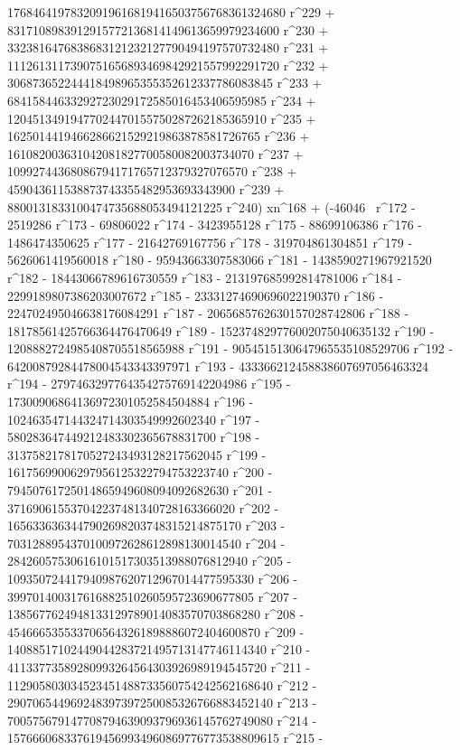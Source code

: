        17684641978320919616819416503756768361324680 r^229 + 
       8317108983912915772136814149613659979234600 r^230 + 
       3323816476838683121232127790494197570732480 r^231 + 
       1112613117390751656893469842921557992291720 r^232 + 
       306873652244418498965355352612337786083845 r^233 + 
       68415844633292723029172585016453406595985 r^234 + 
       12045134919477024470155750287262185365910 r^235 + 
       1625014419466286621529219863878581726765 r^236 + 
       161082003631042081827700580082003734070 r^237 + 
       10992744368086794171765712379327076570 r^238 + 
       459043611538873743355482953693343900 r^239 + 
       8800131833100474735688053494121225 r^240) xn^168 + (-46046 \
r^172 - 2519286 r^173 - 69806022 r^174 - 3423955128 r^175 - 
       88699106386 r^176 - 1486474350625 r^177 - 
       21642769167756 r^178 - 319704861304851 r^179 - 
       5626061419560018 r^180 - 95943663307583066 r^181 - 
       1438590271967921520 r^182 - 18443066789616730559 r^183 - 
       213197685992814781006 r^184 - 2299189807386203007672 r^185 - 
       23331274690696022190370 r^186 - 
       224702495046638176084291 r^187 - 
       2065685762630157028742806 r^188 - 
       18178561425766364476470649 r^189 - 
       152374829776002075040635132 r^190 - 
       1208882724985408705518565988 r^191 - 
       9054515130647965535108529706 r^192 - 
       64200879284478004543343397971 r^193 - 
       433366212458838607697056463324 r^194 - 
       2797463297764354275769142204986 r^195 - 
       17300906864136972301052584504884 r^196 - 
       102463547144324714303549992602340 r^197 - 
       580283647449212483302365678831700 r^198 - 
       3137582178170527243493128217562045 r^199 - 
       16175699006297956125322794753223740 r^200 - 
       79450761725014865949608094092682630 r^201 - 
       371690615537042237481340728163366020 r^202 - 
       1656336363447902698203748315214875170 r^203 - 
       7031288954370100972628612898130014540 r^204 - 
       28426057530616101517303513988076812940 r^205 - 
       109350724417940987620712967014477595330 r^206 - 
       399701400317616882510260595723690677805 r^207 - 
       1385677624948133129789014083570703868280 r^208 - 
       4546665355337065643261898886072404600870 r^209 - 
       14088517102449044283721495713147746114340 r^210 - 
       41133773589280993264564303926989194545720 r^211 - 
       112905803034523451488733560754242562168640 r^212 - 
       290706544969248397397250085326766883452140 r^213 - 
       700575679147708794639093796936145762749080 r^214 - 
       1576660683376194569934960869776773538809615 r^215 - 
